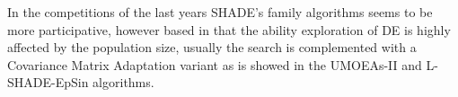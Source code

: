 In the competitions of the last years SHADE's family algorithms seems to be more participative, however based in that the ability exploration of DE is highly affected by the population size, usually the search is complemented with a Covariance Matrix Adaptation variant as is showed in the UMOEAs-II and L-SHADE-EpSin algorithms.
%
%


